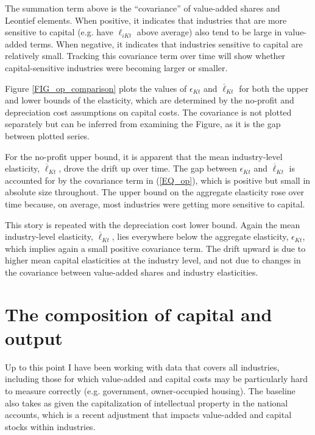 \documentclass[11pt]{article}
\begin{document}
The summation term above is the ``covariance'' of value-added shares and Leontief elements. When positive, it indicates that industries that are more sensitive to capital (e.g. have $\ell_{iKt}$ above average) also tend to be large in value-added terms. When negative, it indicates that industries sensitive to capital are relatively small. Tracking this covariance term over time will show whether capital-sensitive industries were becoming larger or smaller.

Figure \ref{FIG_op_comparison} plots the values of $\epsilon_{Kt}$ and $\overline{\ell}_{Kt}$ for both the upper and lower bounds of the elasticity, which are determined by the no-profit and depreciation cost assumptions on capital costs. The covariance is not plotted separately but can be inferred from examining the Figure, as it is the gap between plotted series. 

For the no-profit upper bound, it is apparent that the mean industry-level elasticity, $\overline{\ell}_{Kt}$, drove the drift up over time. The gap between $\epsilon_{Kt}$ and $\overline{\ell}_{Kt}$ is accounted for by the covariance term in (\ref{EQ_op}), which is positive but small in absolute size throughout. The upper bound on the aggregate elasticity rose over time because, on average, most industries were getting more sensitive to capital. 

This story is repeated with the depreciation cost lower bound. Again the mean industry-level elasticity, $\overline{\ell}_{Kt}$, lies everywhere below the aggregate elasticity, $\epsilon_{Kt}$, which implies again a small positive covariance term. The drift upward is due to higher mean capital elasticities at the industry level, and not due to changes in the covariance between value-added shares and industry elasticities. 

\section{The composition of capital and output}
Up to this point I have been working with data that covers all industries, including those for which value-added and capital costs may be particularly hard to measure correctly (e.g. government, owner-occupied housing). The baseline also takes as given the capitalization of intellectual property in the national accounts, which is a recent adjustment that impacts value-added and capital stocks within industries.
\end{document}
